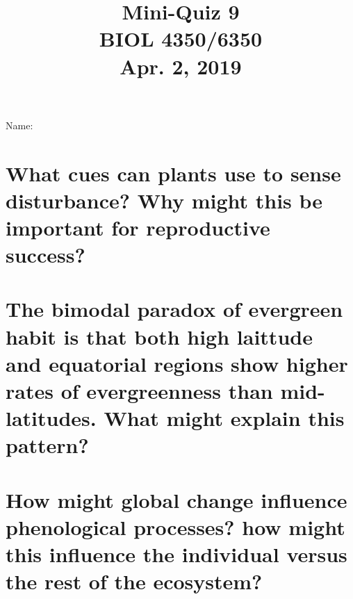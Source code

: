 \documentclass[12pt, notitlepage]{article}   	%
\title{
	\textbf{
		Mini-Quiz 9
	} \\
	\large BIOL 4350/6350 \\
	\large Apr. 2, 2019 \\
}
\date{\vspace{-5ex}}
\def\wl{\par \vspace{\baselineskip}}
\begin{document}
{\selectfont %

\large{Name:}

{\let\newpage\relax\maketitle}

\section{\small{What cues can plants use to sense disturbance? Why might this
be important for reproductive success?}}
\wl
\wl
\wl
\wl
\wl
\wl
\wl
\wl
\wl
\wl

\section{\small{The bimodal paradox of evergreen habit is that both high laittude and 
equatorial regions show higher rates of evergreenness than mid-latitudes. What might
explain this pattern?}}

\newpage

\section{\small{How might global change influence phenological processes? how might this
influence the individual versus the rest of the ecosystem?}}

} %
\end{document}
